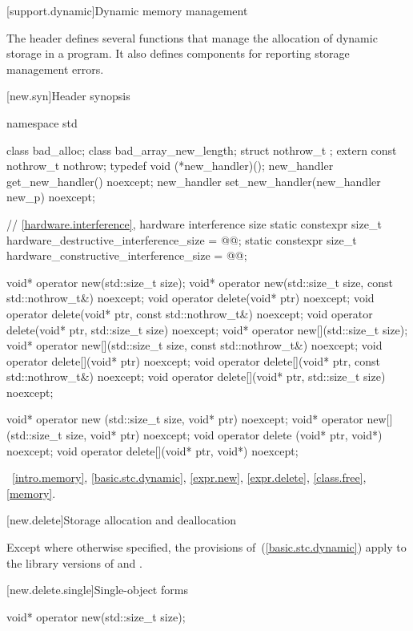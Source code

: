 [support.dynamic]{Dynamic memory management}

\pnum
The header
defines several
functions that manage the allocation of dynamic storage in a program.
It also defines components for reporting storage management errors.

[new.syn]{Header  synopsis}
%
%

\begin{codeblock}
namespace std {
  class bad_alloc;
  class bad_array_new_length;
  struct nothrow_t {};
  extern const nothrow_t nothrow;
  typedef void (*new_handler)();
  new_handler get_new_handler() noexcept;
  new_handler set_new_handler(new_handler new_p) noexcept;

  // \ref{hardware.interference}, hardware interference size
  static constexpr size_t hardware_destructive_interference_size = @\impdef{}@;
  static constexpr size_t hardware_constructive_interference_size = @\impdef{}@;
}

void* operator new(std::size_t size);
void* operator new(std::size_t size, const std::nothrow_t&) noexcept;
void  operator delete(void* ptr) noexcept;
void  operator delete(void* ptr, const std::nothrow_t&) noexcept;
void  operator delete(void* ptr, std::size_t size) noexcept;
void* operator new[](std::size_t size);
void* operator new[](std::size_t size, const std::nothrow_t&) noexcept;
void  operator delete[](void* ptr) noexcept;
void  operator delete[](void* ptr, const std::nothrow_t&) noexcept;
void  operator delete[](void* ptr, std::size_t size) noexcept;

void* operator new  (std::size_t size, void* ptr) noexcept;
void* operator new[](std::size_t size, void* ptr) noexcept;
void  operator delete  (void* ptr, void*) noexcept;
void  operator delete[](void* ptr, void*) noexcept;
\end{codeblock}

\xref~\ref{intro.memory}, \ref{basic.stc.dynamic},
\ref{expr.new}, \ref{expr.delete}, \ref{class.free},
\ref{memory}.

[new.delete]{Storage allocation and deallocation}

\pnum
Except where otherwise specified, the provisions of~(\ref{basic.stc.dynamic})
apply to the library versions of  and .

[new.delete.single]{Single-object forms}

%
\begin{itemdecl}
void* operator new(std::size_t size);
\end{itemdecl}

